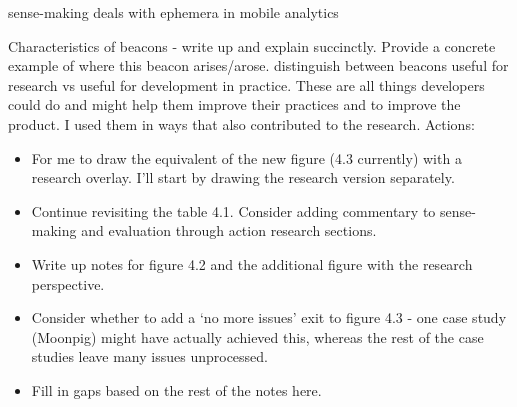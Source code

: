 sense-making deals with ephemera in mobile analytics 

Characteristics of beacons - write up and explain succinctly. Provide a concrete example of where this beacon arises/arose. distinguish between beacons useful for research vs useful for development in practice. These are all things developers could do and might help them improve their practices and to improve the product. I used them in ways that also contributed to the research.  
Actions: 
\begin{itemize}
    \item For me to draw the equivalent of the new figure (4.3 currently) with a research overlay. I'll start by drawing the research version separately. 
    \item Continue revisiting the table 4.1. Consider adding commentary to sense-making and evaluation through action research sections.
    \item Write up notes for figure 4.2 and the additional figure with the research perspective. 
    \item Consider whether to add a `no more issues' exit to figure 4.3 - one case study (Moonpig) might have actually achieved this, whereas the rest of the case studies leave many issues unprocessed.
    \item Fill in gaps based on the rest of the notes here.
\end{itemize}


\dotfill

\clearpage
